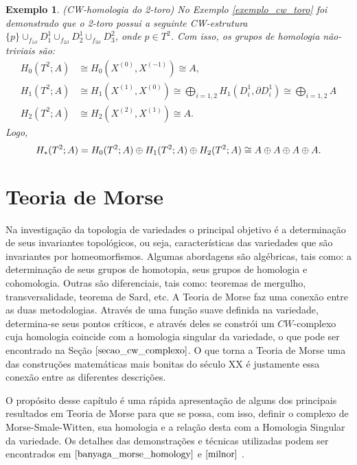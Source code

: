 \documentclass[12pt]{book}
\newtheorem{exemplo}[teorema]{Exemplo}
\newcommand{\celula}[2]{D^{#1}_{#2}}
\newcommand{\homologia}[2]{H_{#1}(#2;A)}
\newcommand{\homologiarelcel}[3]{H_{#1}(D^{#2}_{#3}, \partial D^{#2}_{#3})}
\newcommand{\homologiarelskele}[3]{H_{#1}(X^{(#2)}, X^{(#3)})}
\newcommand{\somadir}[1]{\bigoplus \limits_{#1}}
\begin{document}
	\begin{exemplo}
		(CW-homologia do 2-toro) No Exemplo \ref{exemplo_cw_toro} foi demonstrado que o 2-toro possui a seguinte CW-estrutura $\{p\}\cup_{f_{1\partial}}\celula{1}{1}\cup_{f_{2\partial}}\celula{1}{2}\cup_{f_{3\partial}}\celula{2}{3}$, onde $p \in T^{2}$. Com isso, os grupos de homologia não-triviais são:
		$$
		\begin{aligned}
		\homologia{0}{T^{2}} &\cong \homologiarelskele{0}{0}{-1} \cong A,
		\\
		\homologia{1}{T^{2}} &\cong \homologiarelskele{1}{1}{0} \cong \somadir{i=1,2}\homologiarelcel{1}{1}{i} \cong \somadir{i=1,2} A
		\\
		\homologia{2}{T^{2}} &\cong \homologiarelskele{2}{2}{1} \cong A.
		\end{aligned}
		$$
		Logo,
		$$
		\\
		\homologia{*}{T^{2}} = \homologia{0}{T^{2}}\oplus\homologia{1}{T^{2}} \oplus\homologia{2}{T^{2}}\cong A \oplus A \oplus A \oplus A.
		$$
	\end{exemplo}	
	
	
	\chapter{Teoria de Morse}\label{capitulo_teoria_morse}
	Na investigação da topologia de variedades o principal objetivo é a determinação de seus invariantes topológicos, ou seja, características das variedades que são invariantes por homeomorfismos. Algumas abordagens são algébricas, tais como: a determinação de seus grupos de homotopia, seus grupos de homologia e cohomologia. Outras são diferenciais, tais como: teoremas de mergulho, transversalidade, teorema de Sard, etc. A Teoria de Morse faz uma conexão entre as duas metodologias. Através de uma função suave definida na variedade, determina-se seus pontos críticos, e através deles se constrói um $CW$-complexo cuja homologia coincide com a homologia singular da variedade, o que pode ser encontrado na Seção $\ref{secao_cw_complexo}$. O que torna a Teoria de Morse uma das construções matemáticas mais bonitas do século XX é justamente essa conexão entre as diferentes descrições.
	
	O propósito desse capítulo é uma rápida apresentação de alguns dos principais resultados em Teoria de Morse para que se possa, com isso, definir o complexo de Morse-Smale-Witten, sua homologia e a relação desta com a Homologia Singular da variedade. Os detalhes das demonstrações e técnicas utilizadas podem ser encontrados em $\cite{banyaga_morse_homology}$ e $\cite{milnor}$ .
	
\end{document}
